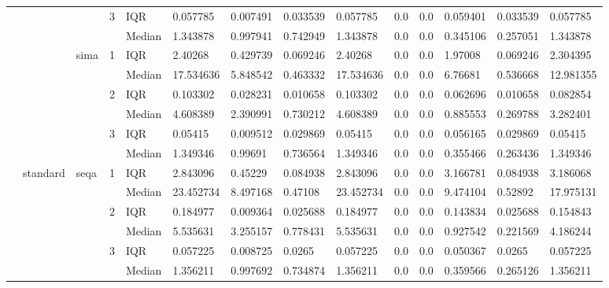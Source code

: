 \begin{tabular}{llllllllllllll}
    &       &      & 3 & IQR &   0.057785 &   0.007491 &  0.033539 &   0.057785 &       0.0 &       0.0 &   0.059401 &  0.033539 &   0.057785 \\
    &       &      &   & Median &   1.343878 &   0.997941 &  0.742949 &   1.343878 &       0.0 &       0.0 &   0.345106 &  0.257051 &   1.343878 \\
    &       & sima & 1 & IQR &    2.40268 &   0.429739 &  0.069246 &    2.40268 &       0.0 &       0.0 &    1.97008 &  0.069246 &   2.304395 \\
    &       &      &   & Median &  17.534636 &   5.848542 &  0.463332 &  17.534636 &       0.0 &       0.0 &    6.76681 &  0.536668 &  12.981355 \\
    &       &      & 2 & IQR &   0.103302 &   0.028231 &  0.010658 &   0.103302 &       0.0 &       0.0 &   0.062696 &  0.010658 &   0.082854 \\
    &       &      &   & Median &   4.608389 &   2.390991 &  0.730212 &   4.608389 &       0.0 &       0.0 &   0.885553 &  0.269788 &   3.282401 \\
    &       &      & 3 & IQR &    0.05415 &   0.009512 &  0.029869 &    0.05415 &       0.0 &       0.0 &   0.056165 &  0.029869 &    0.05415 \\
    &       &      &   & Median &   1.349346 &    0.99691 &  0.736564 &   1.349346 &       0.0 &       0.0 &   0.355466 &  0.263436 &   1.349346 \\
    & standard & seqa & 1 & IQR &   2.843096 &    0.45229 &  0.084938 &   2.843096 &       0.0 &       0.0 &   3.166781 &  0.084938 &   3.186068 \\
    &       &      &   & Median &  23.452734 &   8.497168 &   0.47108 &  23.452734 &       0.0 &       0.0 &   9.474104 &   0.52892 &  17.975131 \\
    &       &      & 2 & IQR &   0.184977 &   0.009364 &  0.025688 &   0.184977 &       0.0 &       0.0 &   0.143834 &  0.025688 &   0.154843 \\
    &       &      &   & Median &   5.535631 &   3.255157 &  0.778431 &   5.535631 &       0.0 &       0.0 &   0.927542 &  0.221569 &   4.186244 \\
    &       &      & 3 & IQR &   0.057225 &   0.008725 &    0.0265 &   0.057225 &       0.0 &       0.0 &   0.050367 &    0.0265 &   0.057225 \\
    &       &      &   & Median &   1.356211 &   0.997692 &  0.734874 &   1.356211 &       0.0 &       0.0 &   0.359566 &  0.265126 &   1.356211 \\

\end{tabular}
